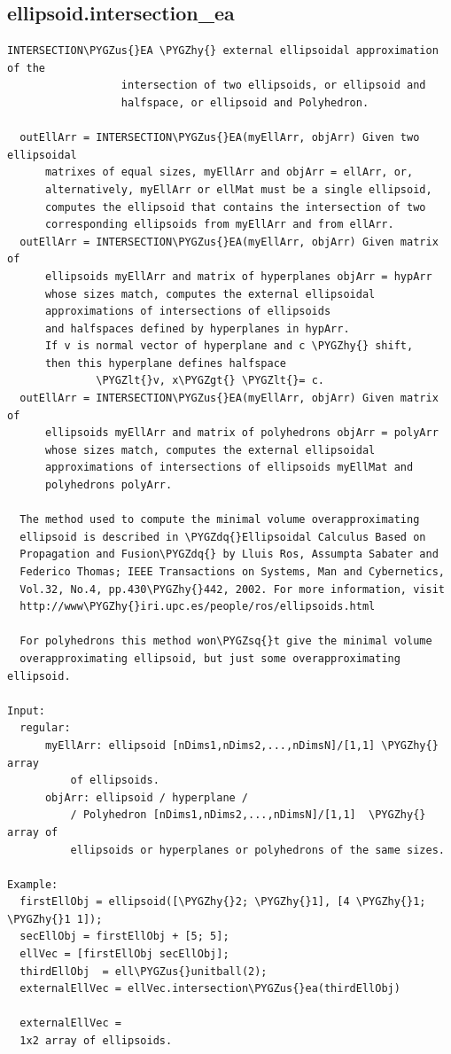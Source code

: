 \documentclass[letterpaper,10pt,english]{sphinxmanual}
\def\PYGZus{\char`\_}
\def\PYGZlt{\char`\<}
\def\PYGZgt{\char`\>}
\def\PYGZhy{\char`\-}
\def\PYGZsq{\char`\'}
\def\PYGZdq{\char`\"}
\begin{document}
\subsection{ellipsoid.intersection\_ea}
\label{chap_functions:ellipsoid-intersection-ea}
\begin{Verbatim}[commandchars=\\\{\}]
INTERSECTION\PYGZus{}EA \PYGZhy{} external ellipsoidal approximation of the
                  intersection of two ellipsoids, or ellipsoid and
                  halfspace, or ellipsoid and Polyhedron.

  outEllArr = INTERSECTION\PYGZus{}EA(myEllArr, objArr) Given two ellipsoidal
      matrixes of equal sizes, myEllArr and objArr = ellArr, or,
      alternatively, myEllArr or ellMat must be a single ellipsoid,
      computes the ellipsoid that contains the intersection of two
      corresponding ellipsoids from myEllArr and from ellArr.
  outEllArr = INTERSECTION\PYGZus{}EA(myEllArr, objArr) Given matrix of
      ellipsoids myEllArr and matrix of hyperplanes objArr = hypArr
      whose sizes match, computes the external ellipsoidal
      approximations of intersections of ellipsoids
      and halfspaces defined by hyperplanes in hypArr.
      If v is normal vector of hyperplane and c \PYGZhy{} shift,
      then this hyperplane defines halfspace
              \PYGZlt{}v, x\PYGZgt{} \PYGZlt{}= c.
  outEllArr = INTERSECTION\PYGZus{}EA(myEllArr, objArr) Given matrix of
      ellipsoids myEllArr and matrix of polyhedrons objArr = polyArr
      whose sizes match, computes the external ellipsoidal
      approximations of intersections of ellipsoids myEllMat and
      polyhedrons polyArr.

  The method used to compute the minimal volume overapproximating
  ellipsoid is described in \PYGZdq{}Ellipsoidal Calculus Based on
  Propagation and Fusion\PYGZdq{} by Lluis Ros, Assumpta Sabater and
  Federico Thomas; IEEE Transactions on Systems, Man and Cybernetics,
  Vol.32, No.4, pp.430\PYGZhy{}442, 2002. For more information, visit
  http://www\PYGZhy{}iri.upc.es/people/ros/ellipsoids.html

  For polyhedrons this method won\PYGZsq{}t give the minimal volume
  overapproximating ellipsoid, but just some overapproximating ellipsoid.

Input:
  regular:
      myEllArr: ellipsoid [nDims1,nDims2,...,nDimsN]/[1,1] \PYGZhy{} array
          of ellipsoids.
      objArr: ellipsoid / hyperplane /
          / Polyhedron [nDims1,nDims2,...,nDimsN]/[1,1]  \PYGZhy{} array of
          ellipsoids or hyperplanes or polyhedrons of the same sizes.

Example:
  firstEllObj = ellipsoid([\PYGZhy{}2; \PYGZhy{}1], [4 \PYGZhy{}1; \PYGZhy{}1 1]);
  secEllObj = firstEllObj + [5; 5];
  ellVec = [firstEllObj secEllObj];
  thirdEllObj  = ell\PYGZus{}unitball(2);
  externalEllVec = ellVec.intersection\PYGZus{}ea(thirdEllObj)

  externalEllVec =
  1x2 array of ellipsoids.
\end{Verbatim}
\end{document}
